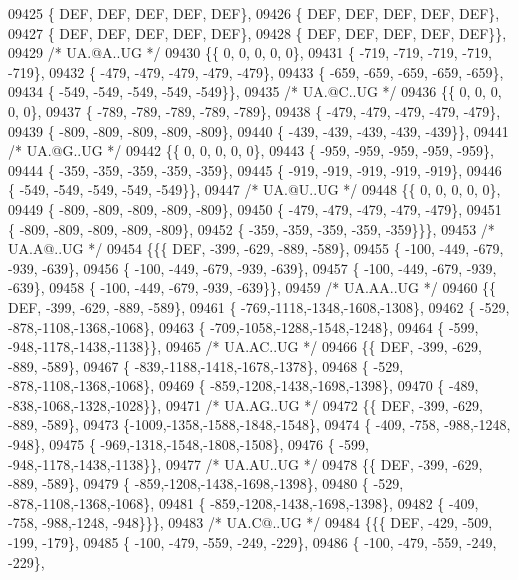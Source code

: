 \begin{DoxyCode}
09425 \{  DEF,  DEF,  DEF,  DEF,  DEF\},
09426 \{  DEF,  DEF,  DEF,  DEF,  DEF\},
09427 \{  DEF,  DEF,  DEF,  DEF,  DEF\},
09428 \{  DEF,  DEF,  DEF,  DEF,  DEF\}\},
09429 \textcolor{comment}{/* UA.@A..UG */}
09430 \{\{    0,    0,    0,    0,    0\},
09431 \{ -719, -719, -719, -719, -719\},
09432 \{ -479, -479, -479, -479, -479\},
09433 \{ -659, -659, -659, -659, -659\},
09434 \{ -549, -549, -549, -549, -549\}\},
09435 \textcolor{comment}{/* UA.@C..UG */}
09436 \{\{    0,    0,    0,    0,    0\},
09437 \{ -789, -789, -789, -789, -789\},
09438 \{ -479, -479, -479, -479, -479\},
09439 \{ -809, -809, -809, -809, -809\},
09440 \{ -439, -439, -439, -439, -439\}\},
09441 \textcolor{comment}{/* UA.@G..UG */}
09442 \{\{    0,    0,    0,    0,    0\},
09443 \{ -959, -959, -959, -959, -959\},
09444 \{ -359, -359, -359, -359, -359\},
09445 \{ -919, -919, -919, -919, -919\},
09446 \{ -549, -549, -549, -549, -549\}\},
09447 \textcolor{comment}{/* UA.@U..UG */}
09448 \{\{    0,    0,    0,    0,    0\},
09449 \{ -809, -809, -809, -809, -809\},
09450 \{ -479, -479, -479, -479, -479\},
09451 \{ -809, -809, -809, -809, -809\},
09452 \{ -359, -359, -359, -359, -359\}\}\},
09453 \textcolor{comment}{/* UA.A@..UG */}
09454 \{\{\{  DEF, -399, -629, -889, -589\},
09455 \{ -100, -449, -679, -939, -639\},
09456 \{ -100, -449, -679, -939, -639\},
09457 \{ -100, -449, -679, -939, -639\},
09458 \{ -100, -449, -679, -939, -639\}\},
09459 \textcolor{comment}{/* UA.AA..UG */}
09460 \{\{  DEF, -399, -629, -889, -589\},
09461 \{ -769,-1118,-1348,-1608,-1308\},
09462 \{ -529, -878,-1108,-1368,-1068\},
09463 \{ -709,-1058,-1288,-1548,-1248\},
09464 \{ -599, -948,-1178,-1438,-1138\}\},
09465 \textcolor{comment}{/* UA.AC..UG */}
09466 \{\{  DEF, -399, -629, -889, -589\},
09467 \{ -839,-1188,-1418,-1678,-1378\},
09468 \{ -529, -878,-1108,-1368,-1068\},
09469 \{ -859,-1208,-1438,-1698,-1398\},
09470 \{ -489, -838,-1068,-1328,-1028\}\},
09471 \textcolor{comment}{/* UA.AG..UG */}
09472 \{\{  DEF, -399, -629, -889, -589\},
09473 \{-1009,-1358,-1588,-1848,-1548\},
09474 \{ -409, -758, -988,-1248, -948\},
09475 \{ -969,-1318,-1548,-1808,-1508\},
09476 \{ -599, -948,-1178,-1438,-1138\}\},
09477 \textcolor{comment}{/* UA.AU..UG */}
09478 \{\{  DEF, -399, -629, -889, -589\},
09479 \{ -859,-1208,-1438,-1698,-1398\},
09480 \{ -529, -878,-1108,-1368,-1068\},
09481 \{ -859,-1208,-1438,-1698,-1398\},
09482 \{ -409, -758, -988,-1248, -948\}\}\},
09483 \textcolor{comment}{/* UA.C@..UG */}
09484 \{\{\{  DEF, -429, -509, -199, -179\},
09485 \{ -100, -479, -559, -249, -229\},
09486 \{ -100, -479, -559, -249, -229\},

\end{DoxyCode}
